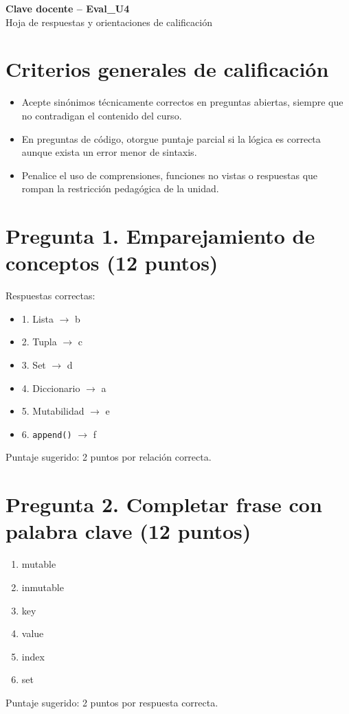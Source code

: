 \documentclass[12pt]{article}
\begin{document}
\begin{center}
{\LARGE \textbf{Clave docente -- Eval\_U4}}\\[2mm]
{\large Hoja de respuestas y orientaciones de calificaci\'on}\\[1mm]
\end{center}

\section*{Criterios generales de calificaci\'on}
\begin{itemize}[leftmargin=1.2em]
    \item Acepte sin\'onimos t\'ecnicamente correctos en preguntas abiertas, siempre que no contradigan el contenido del curso.
    \item En preguntas de c\'odigo, otorgue puntaje parcial si la l\'ogica es correcta aunque exista un error menor de sintaxis.
    \item Penalice el uso de comprensiones, funciones no vistas o respuestas que rompan la restricci\'on pedag\'ogica de la unidad.
\end{itemize}

\section*{Pregunta 1. Emparejamiento de conceptos (12 puntos)}
Respuestas correctas:
\begin{itemize}[leftmargin=1.2em]
    \item 1. Lista $\rightarrow$ b
    \item 2. Tupla $\rightarrow$ c
    \item 3. Set $\rightarrow$ d
    \item 4. Diccionario $\rightarrow$ a
    \item 5. Mutabilidad $\rightarrow$ e
    \item 6. \texttt{append()} $\rightarrow$ f
\end{itemize}
Puntaje sugerido: 2 puntos por relaci\'on correcta.

\section*{Pregunta 2. Completar frase con palabra clave (12 puntos)}
\begin{enumerate}[leftmargin=1.3em]
    \item mutable
    \item inmutable
    \item key
    \item value
    \item index
    \item set
\end{enumerate}
Puntaje sugerido: 2 puntos por respuesta correcta.
\end{document}
